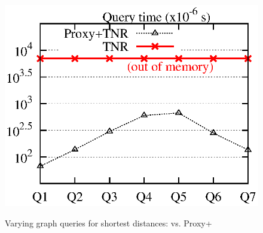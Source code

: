 {\begin{figure}[t!]
\begin{center}
{\includegraphics[scale=0.45]{./exp/query_cus_dist_tnr.eps}}
\end{center}
\vspace{1ex}
\caption{Varying graph queries  for shortest distances: \tnr vs. Proxy+\tnr}
\label{fig:performance_dist_queries_tnr}
\vspace{-1ex}
\end{figure}
}


